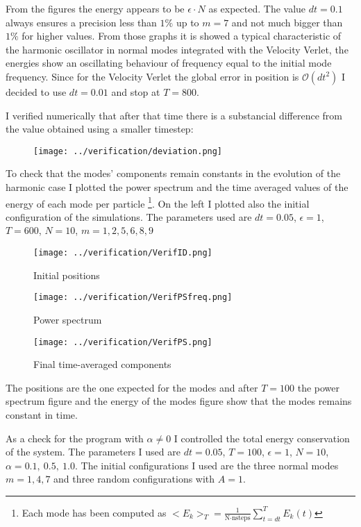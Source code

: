 \documentclass[10pt]{article}
\numberwithin{equation}{section}
\begin{document}
From the figures the energy appears to be $\epsilon \cdot N$ as expected. 
The value $dt=0.1$ always ensures a precision less than $1 \%$ up to $m=7$ and not much bigger than $1\%$ for higher values. 
From those graphs it is showed a typical characteristic of the harmonic oscillator in normal modes integrated with the Velocity Verlet, the energies show an oscillating behaviour of frequency equal to the initial mode frequency. Since for the Velocity Verlet the global error in position is $\mathcal{O}(dt^2)$ I decided to use $dt=0.01$ and stop at $T=800$. 


I verified numerically that after that time there is a substancial difference from the value obtained using a smaller timestep:

\begin{figure} [!htb]
\centering
\texttt{[image: ../verification/deviation.png]}
\end{figure}

\clearpage

To check that the modes' components remain constants in the evolution of the harmonic case I plotted the power spectrum and the time averaged values of the energy of each mode per particle \footnote{Each mode has been computed as $ <E_k>_T = \frac{1}{\text{N} \cdot \text{nsteps}} \sum_{t=dt}^T E_k (t) $}. On the left I plotted also the initial configuration of the simulations. The parameters used are $dt=0.05$, $\epsilon=1$, $T=600$, $N=10$, $m=1,2,5,6,8,9$

\begin{figure}[!htb]
    \texttt{[image: ../verification/VerifID.png]}
    \caption{Initial positions}
\endminipage \hfill
{}
\endminipage \hfill
    \texttt{[image: ../verification/VerifPSfreq.png]}
    \caption{Power spectrum}
\endminipage \hfill
{}
\endminipage \hfill
    \texttt{[image: ../verification/VerifPS.png]}
    \caption{Final time-averaged components}
\endminipage 
\end{figure}

The positions are the one expected for the modes and after $T=100$ the power spectrum figure and the energy of the modes figure show that the modes remains constant in time.

As a check for the program with $\alpha \neq 0$ I controlled the total energy conservation of the system. The parameters I used are $dt=0.05$, $T=100$, $\epsilon = 1$, $N=10$, $\alpha = 0.1, \ 0.5, \ 1.0$. The initial configurations I used are the three normal modes $m=1,4,7$ and three random configurations with $A=1$. 
\end{document}
